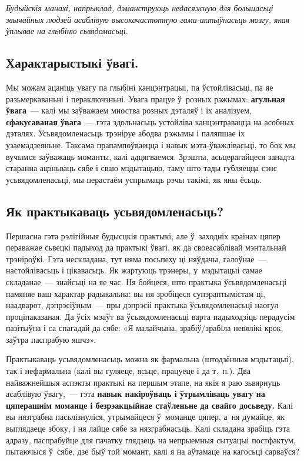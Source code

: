 \emph{Будыйскія манахі, напрыклад, дэманструюць недасяжную для большасьці звычайных людзей асаблівую высокачастотную гама-актыўнасьць мозгу, якая ўплывае на глыбіню сьвядомасьці.}

\subsection*{Характарыстыкі ўвагі.}

Мы можам ацаніць увагу па глыбіні канцэнтрацыі, па ўстойлівасьці, па яе разьмеркаваньні і пераключэньні. Увага працуе ў~розных рэжымах: \textbf{агульная ўвага}~--- калі мы заўважаем мноства розных дэталяў і іх аналізуем, \textbf{сфакусаваная ўвага}~--- гэта здольнасьць устойліва канцэнтравацца на асобных дэталях. Усьвядомленасьць трэніруе абодва рэжымы і паляпшае іх узаемадзеяньне. Таксама прапампоўваецца і навык мэта-ўважлівасьці, то бок мы вучымся заўважаць моманты, калі адцягваемся. Зрэшты, асьцерагайцеся занадта старанна ацэньваць сябе і сваю мэдытацыю, таму што тады губляецца сэнс усьвядомленасьці, мы перастаём успрымаць рэчы такімі, як яны ёсьць.

\subsection*{Як практыкаваць усьвядомленасьць?}

Першасна гэта рэлігійныя будысцкія практыкі, але ў~заходніх краінах цяпер пераважае сьвецкі падыход да практыкі ўвагі, як да своеасаблівай мэнтальнай трэніроўкі. Гэта нескладана, тут няма посьпеху ці няўдачы, галоўнае~--- настойлівасьць і цікавасьць. Як жартуюць трэнеры, у~мэдытацыі самае складанае~--- знайсьці на яе час. Ня бойцеся, што практыка ўсьвядомленасьці памяняе ваш характар радыкальна: вы ня зробіцеся супэраптымістам ці, наадварот, дэпрэсіўным~--- пры дэпрэсіі практыка ўсьвядомленасьці наогул проціпаказаная. Да ўсіх мэаўт ва ўсьвядомленасьці варта падыходзіць перадусім пазітыўна і са спагадай да сябе: «Я малайчына, зрабіў/зрабіла невялікі крок, заўтра паспрабую яшчэ».

Практыкаваць усьвядомленасьць можна як фармальна (штодзённыя мэдытацыі), так і нефармальна (калі вы гуляеце, ясьце, працуеце і да т.~п.). Два найважнейшыя аспэкты практыкі на першым этапе, на якія я раю зьвярнуць асаблівую ўвагу,~--- гэта \textbf{навык накіроўваць і ўтрымліваць увагу на цяперашнім моманце і безрэакцыйнае стаўленьне да свайго досьведу.} Калі вы нязграбна пасьлізнуліся, утрымайцеся ў~моманце цяпер, а~ня думайце, як выглядаеце збоку, і ня лайце сябе за нязграбнасьць. Калі складана зрабіць гэта адразу, паспрабуйце для пачатку глядзець на непрыемныя сытуацыі постфактум, пытаючыся ў~сябе, дзе быў той момант, калі я на аўтамаце на кагосьці сарваўся?

